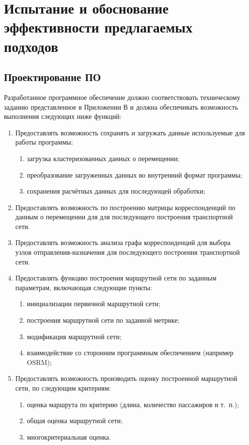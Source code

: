 \chapter{Испытание и обоснование эффективности предлагаемых подходов}
\section{Проектирование ПО}
Разработанное программное обеспечение должно соответствовать техническому заданию представленное в Приложении 
В и должна обеспечивать возможность выполнения следующих ниже функций:
\begin{enumerate}
    \item Предоставлять возможность сохранять и загружать данные используемые для работы программы:
    \begin{enumerate}
        \item загрузка кластеризованных данных о перемещении;
        \item преобразование загруженных данных во внутренний формат программы;
        \item сохранения расчётных данных для последующей обработки;
    \end{enumerate}
    \item Предоставлять возможность по построению матрицы корреспонденций по данным о перемещении для 
        для последующего построения транспортной сети.
    \item Предоставлять возможность анализа графа корреспонденций для выбора узлов отправления-назначения для 
        последующего построения транспортной сети.
    \item Предоставлять функцию построения маршрутной сети по заданным параметрам, включающая следующие 
        пункты:
    \begin{enumerate}
        \item инициализации первичной маршрутной сети;
        \item построения маршрутной сети по заданной метрике;
        \item модификация маршрутной сети;
        \item взаимодействие со сторонним программным обеспечением (например OSRM);
    \end{enumerate}
    \item Предоставлять возможность производить оценку построенной маршрутной сети, по следующим критериям:
    \begin{enumerate}
        \item оценка маршрута по критерию (длина, количество пассажиров и т.~п.);
        \item общая оценка маршрутной сети;
        \item многокритериальная оценка.
    \end{enumerate}
\end{enumerate}

